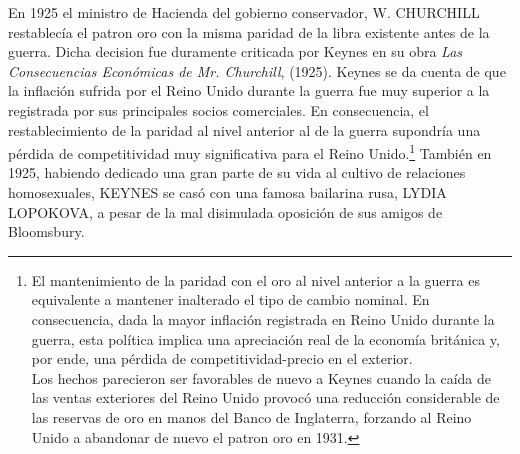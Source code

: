 \documentclass[10pt,a4paper]{article}
\begin{document}
En 1925 el ministro de Hacienda del gobierno conservador, W. CHURCHILL restablecía el patron oro con la misma paridad de la libra existente antes de la guerra. Dicha decision fue duramente criticada por Keynes en su obra \textit{Las Consecuencias Económicas de Mr. Churchill}, (1925). Keynes se da cuenta de que la inflación sufrida por el Reino Unido durante la guerra fue muy superior a la registrada por sus principales socios comerciales. En consecuencia, el restablecimiento de la paridad al nivel anterior al de la guerra supondría una pérdida de competitividad muy significativa para el Reino Unido.\footnote{%
    El mantenimiento de la paridad con el oro al nivel anterior a la guerra es equivalente a mantener inalterado el tipo de cambio nominal. En consecuencia, dada la mayor inflación registrada en Reino Unido durante la guerra, esta política implica una apreciación real de la economía británica y, por ende, una pérdida de competitividad-precio en el exterior.\\
Los hechos parecieron ser favorables de nuevo a Keynes cuando la caída de las ventas exteriores del Reino Unido provocó una reducción considerable de las reservas de oro en manos del Banco de Inglaterra, forzando al Reino Unido a abandonar de nuevo el patron oro en 1931.
} También en 1925, habiendo dedicado una gran parte de su vida al cultivo de relaciones homosexuales, KEYNES se casó con una famosa bailarina rusa, LYDIA LOPOKOVA, a pesar de la mal disimulada oposición de sus amigos de Bloomsbury. 
\end{document}
